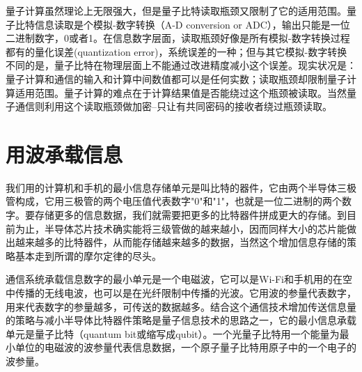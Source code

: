 \documentclass{ctexbook}
\begin{document}
量子计算虽然理论上无限强大，但是量子比特读取瓶颈又限制了它的适用范围。量子比特信息读取是个模拟-数字转换（A-D conversion or ADC），输出只能是一位二进制数字，0或者1。在信息数字层面，读取瓶颈好像是所有模拟-数字转换过程都有的量化误差(quantization error)，系统误差的一种；但与其它模拟-数字转换不同的是，量子比特在物理层面上不能通过改进精度减小这个误差。现实状况是：量子计算和通信的输入和计算中间数值都可以是任何实数；读取瓶颈却限制量子计算适用范围。量子计算的难点在于计算结果值是否能绕过这个瓶颈被读取。当然量子通信则利用这个读取瓶颈做加密--只让有共同密码的接收者绕过瓶颈读取。

\section{用波承载信息}
我们用的计算机和手机的最小信息存储单元是叫比特的器件，它由两个半导体三极管构成，它用三极管的两个电压值代表数字"0"和"1"，也就是一位二进制的两个数字。要存储更多的信息数据，我们就需要把更多的比特器件拼成更大的存储。到目前为止，半导体芯片技术确实能将三级管做的越来越小，因而同样大小的芯片能做出越来越多的比特器件，从而能存储越来越多的数据，当然这个增加信息存储的策略基本走到所谓的摩尔定律的尽头。

通信系统承载信息数字的最小单元是一个电磁波，它可以是Wi-Fi和手机用的在空中传播的无线电波，也可以是在光纤限制中传播的光波。它用波的参量代表数字，用来代表数字的参量越多，可传送的数据越多。结合这个通信技术增加传送信息量的策略与减小半导体比特器件策略是量子信息技术的思路之一，它的最小信息承载单元是量子比特（quantum bit或缩写成qubit）。一个光量子比特用一个能量为最小单位的电磁波的波参量代表信息数据，一个原子量子比特用原子中的一个电子的波参量。
\end{document}
